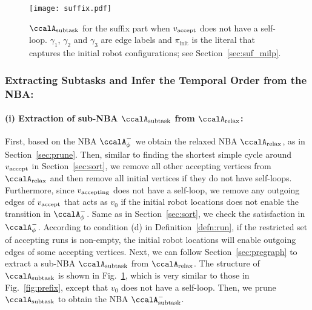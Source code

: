 \documentclass[Afour,sageh,times]{sagej}
\newcommand{\auto}[1]{\ccalA_{\textup{#1}}}
\newcommand{\autop}{\ccalA_{\phi}}
\newcommand{\vertex}[1]{v_{\textup{#1}}}
\begin{document}
{{  \begin{figure}[!t]
    \centering
    \texttt{[image: suffix.pdf]}
    \caption{$\auto{subtask}$ for the suffix part when $\vertex{accept}$ does not have a self-loop. $\gamma_1$, $\gamma_2$ and $\gamma_3$ are edge labels and $\pi_{\text{init}}$ is the literal that captures the initial robot configurations; see Section~\ref{sec:suf_milp}.}
    \label{fig:suffix}
  \end{figure}

  \subsubsection{Extracting Subtasks and Infer the Temporal Order from the NBA:}\label{sec:suf_prune}
  \paragraph{(i) Extraction of sub-NBA $\auto{subtask}$ from $\auto{relax}$:} First, based on the NBA $\autop^-$ we obtain the relaxed NBA $\auto{relax}$, as in Section~\ref{sec:prune}.  Then, similar to finding the shortest simple cycle around $\vertex{accept}$ in Section~\ref{sec:sort}, we remove all other accepting vertices from $\auto{relax}$ and then remove all initial vertices if they do not have self-loops. Furthermore, since $\vertex{accepting}$ does not have a self-loop, we remove any outgoing edges of $\vertex{accept}$ that acts as $v_0$ if the initial robot locations does not enable the transition in $\autop^-$. Same as in Section~\ref{sec:sort}, we check the satisfaction in $\autop^-$. According to condition (d) in Definition~\ref{defn:run}, if the restricted set of accepting runs is non-empty, the initial robot locations will enable outgoing edges of some accepting vertices. Next, we can follow Section~\ref{sec:pregraph} to  extract a sub-NBA $\auto{subtask}$ from $\auto{relax}$. The structure of $\auto{subtask}$ is shown in Fig.~\ref{fig:suffix}, which is very similar to those in Fig.~\ref{fig:prefix}, except that $v_0$ does not have a self-loop.  Then, we prune $\auto{subtask}$ to obtain the NBA $\auto{subtask}^-$.
}}
\end{document}
